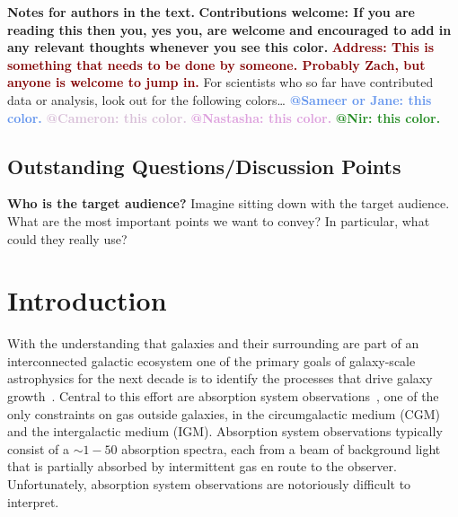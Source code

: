 \documentclass[fleqn,usenatbib]{mnras}
\makeatletter
\newcommand{\thoughts}[1]{\textcolor{BurntOrange}{\textbf{Contributions welcome: #1}}}
\newcommand{\todo}[1]{\textcolor{Maroon}{\textbf{Address: #1}}}
\newcommand{\atsameer}[1]{\textcolor{CornflowerBlue}{\textbf{@Sameer or Jane: #1}}}
\newcommand{\atcameron}[1]{\textcolor{Thistle}{\textbf{@Cameron: #1}}}
\newcommand{\atnastasha}[1]{\textcolor{Plum}{\textbf{@Nastasha: #1}}}
\newcommand{\atnir}[1]{\textcolor{ForestGreen}{\textbf{@Nir: #1}}}
\makeatother
\begin{document}
\textbf{Notes for authors in the text.}
\thoughts{If you are reading this then you, yes you, are welcome and encouraged to add in any relevant thoughts whenever you see this color.}
\todo{This is something that needs to be done by someone. Probably Zach, but anyone is welcome to jump in.}
For scientists who so far have contributed data or analysis, look out for the following colors\ldots
\atsameer{this color.}
\atcameron{this color.}
\atnastasha{this color.}
\atnir{this color.}

\subsection{Outstanding Questions/Discussion Points}

\textbf{Who is the target audience?}
Imagine sitting down with the target audience.
What are the most important points we want to convey?
In particular, what could they really use?

\section{Introduction}

With the understanding that galaxies and their surrounding are part of an interconnected galactic ecosystem one of the primary goals of galaxy-scale astrophysics for the next decade is to identify the processes that drive galaxy growth~\citep{Decadal2020}.
Central to this effort are absorption system observations~\citep[e.g.][]{Bahcall1993, Lanzetta1995, Lauroesch1996, Churchill1996}, one of the only constraints on gas outside galaxies, in the circumgalactic medium (CGM) and the intergalactic medium (IGM).
Absorption system observations typically consist of a $\sim 1-50$ absorption spectra, each from a beam of background light that is partially absorbed by intermittent gas en route to the observer.
Unfortunately, absorption system observations are notoriously difficult to interpret.
\end{document}
